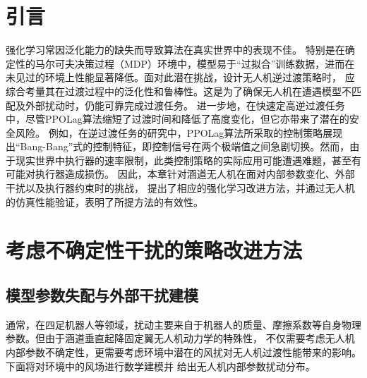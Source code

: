 \section{引言}
强化学习常因泛化能力的缺失而导致算法在真实世界中的表现不佳。
特别是在确定性的马尔可夫决策过程（MDP）环境中，模型易于“过拟合”训练数据，进而在未见过的环境上性能显著降低。面对此潜在挑战，设计无人机逆过渡策略时，
应综合考量其在过渡过程中的泛化性和鲁棒性。这是为了确保无人机在遭遇模型不匹配及外部扰动时，仍能可靠完成过渡任务。
进一步地，在快速定高逆过渡任务中，尽管PPOLag算法缩短了过渡时间和降低了高度变化，但它亦带来了潜在的安全风险。
例如，在逆过渡任务的研究中，PPOLag算法所采取的控制策略展现出“Bang-Bang”式的控制特征，即控制信号在两个极端值之间急剧切换。然而，由于现实世界中执行器的速率限制，此类控制策略的实际应用可能遭遇难题，甚至有可能对执行器造成损伤。
因此，本章针对涵道无人机在面对内部参数变化、外部干扰以及执行器约束时的挑战，
提出了相应的强化学习改进方法，并通过无人机的仿真性能验证，表明了所提方法的有效性。
\section{考虑不确定性干扰的策略改进方法}
\subsection{模型参数失配与外部干扰建模}
通常，在四足机器人等领域，扰动主要来自于机器人的质量、摩擦系数等自身物理参数。但由于涵道垂直起降固定翼无人机动力学的特殊性，
不仅需要考虑无人机内部参数不确定性，更需要考虑环境中潜在的风扰对无人机过渡性能带来的影响。下面将对环境中的风场进行数学建模并
给出无人机内部参数扰动分布。
